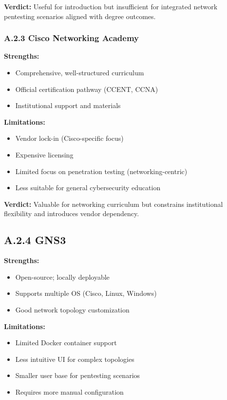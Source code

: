 \textbf{Verdict:} Useful for introduction but insufficient for integrated network pentesting scenarios aligned with degree outcomes.


\subsubsection*{A.2.3 Cisco Networking Academy}


\textbf{Strengths:}
\begin{itemize}
    \item Comprehensive, well-structured curriculum
    \item Official certification pathway (CCENT, CCNA)
    \item Institutional support and materials
\end{itemize}


\textbf{Limitations:}
\begin{itemize}
    \item Vendor lock-in (Cisco-specific focus)
    \item Expensive licensing
    \item Limited focus on penetration testing (networking-centric)
    \item Less suitable for general cybersecurity education
\end{itemize}


\textbf{Verdict:} Valuable for networking curriculum but constrains institutional flexibility and introduces vendor dependency.


\subsection*{A.2.4 GNS3}


\textbf{Strengths:}
\begin{itemize}
    \item Open-source; locally deployable
    \item Supports multiple OS (Cisco, Linux, Windows)
    \item Good network topology customization
\end{itemize}


\textbf{Limitations:}
\begin{itemize}
    \item Limited Docker container support
    \item Less intuitive UI for complex topologies
    \item Smaller user base for pentesting scenarios
    \item Requires more manual configuration
\end{itemize}


